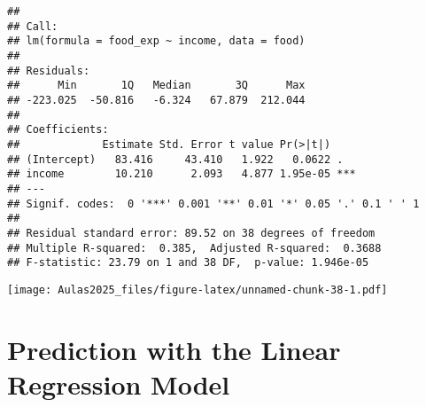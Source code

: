\documentclass[
]{book}
\newenvironment{Shaded}{\begin{snugshade}}{\end{snugshade}}
\newcommand{\AttributeTok}[1]{\textcolor[rgb]{0.13,0.29,0.53}{#1}}
\newcommand{\CommentTok}[1]{\textcolor[rgb]{0.56,0.35,0.01}{\textit{#1}}}
\newcommand{\ConstantTok}[1]{\textcolor[rgb]{0.56,0.35,0.01}{#1}}
\newcommand{\DecValTok}[1]{\textcolor[rgb]{0.00,0.00,0.81}{#1}}
\newcommand{\FunctionTok}[1]{\textcolor[rgb]{0.13,0.29,0.53}{\textbf{#1}}}
\newcommand{\NormalTok}[1]{#1}
\newcommand{\SpecialCharTok}[1]{\textcolor[rgb]{0.81,0.36,0.00}{\textbf{#1}}}
\newcommand{\StringTok}[1]{\textcolor[rgb]{0.31,0.60,0.02}{#1}}
\begin{document}
\begin{verbatim}
## 
## Call:
## lm(formula = food_exp ~ income, data = food)
## 
## Residuals:
##      Min       1Q   Median       3Q      Max 
## -223.025  -50.816   -6.324   67.879  212.044 
## 
## Coefficients:
##             Estimate Std. Error t value Pr(>|t|)    
## (Intercept)   83.416     43.410   1.922   0.0622 .  
## income        10.210      2.093   4.877 1.95e-05 ***
## ---
## Signif. codes:  0 '***' 0.001 '**' 0.01 '*' 0.05 '.' 0.1 ' ' 1
## 
## Residual standard error: 89.52 on 38 degrees of freedom
## Multiple R-squared:  0.385,  Adjusted R-squared:  0.3688 
## F-statistic: 23.79 on 1 and 38 DF,  p-value: 1.946e-05
\end{verbatim}

\begin{Shaded}
\end{Shaded}

\texttt{[image: Aulas2025\_files/figure-latex/unnamed-chunk-38-1.pdf]}

\hypertarget{prediction-with-the-linear-regression-model}{%
\section{Prediction with the Linear Regression
Model}\label{prediction-with-the-linear-regression-model}}
\end{document}
